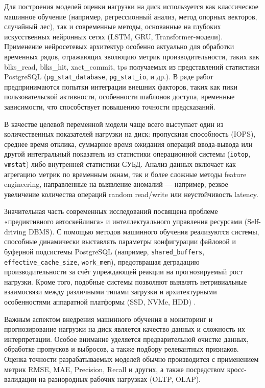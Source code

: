 Для построения моделей оценки нагрузки на диск используется как классическое машинное обучение (например, регрессионный анализ, метод опорных векторов, случайный лес), так и современные методы, основанные на глубоких искусственных нейронных сетях (LSTM, GRU, Transformer-модели). Применение нейросетевых архитектур особенно актуально для обработки временных рядов, отражающих эволюцию метрик производительности, таких как blks\_read, blks\_hit, xact\_commit, tps получаемых из представлений статистики PostgreSQL (\texttt{pg\_stat\_database}, \texttt{pg\_stat\_io}, и др.). В ряде работ предпринимаются попытки интеграции внешних факторов, таких как пики пользовательской активности, особенности шаблонов доступа, временные зависимости, что способствует повышению точности предсказаний\cite{sun2023predictive}.

В качестве целевой переменной модели чаще всего выступает один из количественных показателей нагрузки на диск: пропускная способность (IOPS), среднее время отклика, суммарное время ожидания операций ввода-вывода или другой интегральный показатель из статистики операционной системы (\texttt{iotop}, \texttt{vmstat}) либо внутренней статистики СУБД. Анализ данных включает как агрегацию метрик по временным окнам, так и более сложные методы feature engineering, направленные на выявление аномалий — например, резкое увеличение количества операций random read/write или неустойчивость latency.

Значительная часть современных исследований посвящена проблеме «предиктивного автоскейлинга» и интеллектуального управления ресурсами (Self-driving DBMS). С помощью методов машинного обучения реализуются системы, способные динамически выставлять параметры конфигурации файловой и буферной подсистемы PostgreSQL (например, \texttt{shared\_buffers}, \texttt{effective\_cache\_size}, \texttt{work\_mem}), предотвращая деградацию производительности за счёт упреждающей реакции на прогнозируемый рост нагрузки. Кроме того, подобные системы позволяют выявлять нетривиальные взаимосвязи между различными типами загрузки и архитектурными особенностями аппаратной платформы (SSD, NVMe, HDD) \cite{ozkaya2020deep}.

Важным аспектом внедрения машинного обучения в мониторинг и прогнозирование нагрузки на диск является качество данных и сложность их интерпретации. Особое внимание уделяется предварительной очистке данных, обработке пропусков и выбросов, а также подбору релевантных признаков. Оценка точности разрабатываемых моделей обычно производится с применением метрик RMSE, MAE, Precision, Recall и других, а также посредством кросс-валидации на разнородных рабочих нагрузках (OLTP, OLAP).

